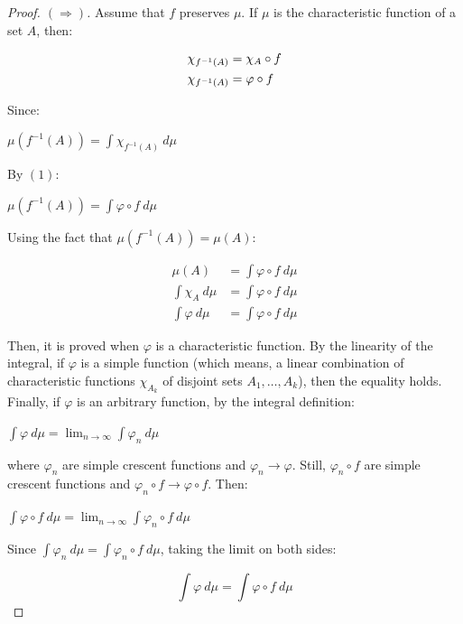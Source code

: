 \documentclass[a4paper,12pt] {article}
\begin{document}
\begin{proof}[Proof. \( (\Rightarrow) \)]
Assume that $f$ preserves $\mu$. If $\mu$ is the characteristic function of a set $A$, then:

\begin{align}
\chi_{f^{-1}(A)} &= \chi_A \circ f \notag \\
\chi_{f^{-1}(A)} &= \varphi \circ f
\end{align}

 Since:
\begin{center}
    $\mu(f^{-1}(A)) = \displaystyle \int \chi_{f^{-1}(A)}\ d\mu$
\end{center}

 By $(1)$:
\begin{center}
    $\mu(f^{-1}(A)) = \displaystyle \int \varphi \circ f\ d\mu$
\end{center}

 Using the fact that $\mu(f^{-1}(A)) = \mu(A)$:

\begin{align*}
    \mu(A) &= \displaystyle \int \varphi \circ f\ d\mu\\
    \displaystyle \int \chi_A\ d\mu &= \displaystyle \int \varphi \circ f\ d\mu\\
    \displaystyle \int \varphi\ d\mu &= \displaystyle \int \varphi \circ f\ d\mu
\end{align*}

 Then, it is proved when $\varphi$ is a characteristic function. By the linearity of the integral, if $\varphi$ is a simple function (which means, a linear combination of characteristic functions $\chi_{A_k}$ of disjoint sets $A_1,\dots,A_k$), then the equality holds. Finally, if $\varphi$ is an arbitrary function, by the integral definition:

\begin{center}
    $\displaystyle \int \varphi\ d\mu = \lim_{n \to \infty} \displaystyle \int \varphi_n\ d\mu$
\end{center}

\noindent where $\varphi_n$ are simple crescent functions and $\varphi_n \to \varphi$. Still, $\varphi_n \circ f$ are simple crescent functions and $\varphi_n \circ f \to \varphi \circ f$. Then:

\begin{center}
    $\displaystyle \int \varphi \circ f\ d\mu = \lim_{n \to \infty} \displaystyle \int \varphi_n \circ f\ d\mu$
\end{center}

 Since $\int \varphi_n\ d\mu = \int \varphi_n \circ f\ d\mu$, taking the limit on both sides:

\[
\displaystyle \int \varphi\ d\mu = \displaystyle \int \varphi \circ f\ d\mu 
\]
\end{proof}
\end{document}
